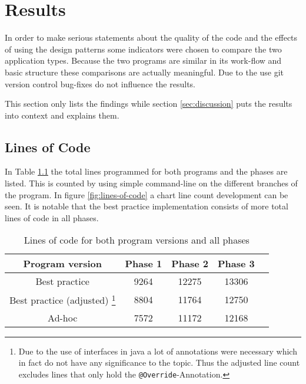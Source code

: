 \chapter{Results}
In order to make serious statements about the quality of the code and the effects of using the design patterns some indicators were chosen to compare the two application types. Because the two programs are similar in its work-flow and basic structure these comparisons are actually meaningful. Due to the use git version control bug-fixes do not influence the results. 

This section only lists the findings while section \ref{sec:discussion} puts the results into context and explains them.

\section{Lines of Code}
\label{sec:line-count}
In Table \ref{table:lines-of-code} the total lines programmed for both programs and the phases are listed. This is counted by using simple command-line on the different branches of the program. In figure \ref{fig:lines-of-code} a chart line count development can be seen. It is notable that the best practice implementation consists of more total lines of code in all phases. 

\begin{table}[htbp]
	\centering

	\begin{tabular}{|c|c|c|c|c|} \hline
	\textbf{Program version} &\textbf{Phase 1} & \textbf{Phase 2} & \textbf{Phase 3} \\ \hline
	Best practice & 9264 & 12275 & 13306 \\ \hline
	Best practice (adjusted) \footnote{Due to the use of interfaces in java a lot of annotations were necessary which in fact do not have any significance to the topic. Thus the adjusted line count excludes lines that only hold the \texttt{@Override}-Annotation.} & 8804 & 11764 & 12750 \\ \hline
	Ad-hoc & 7572 & 11172 & 12168 \\ \hline
	\end{tabular}
	\caption{Lines of code for both program versions and all phases}
	\label{table:lines-of-code}
\end{table}

